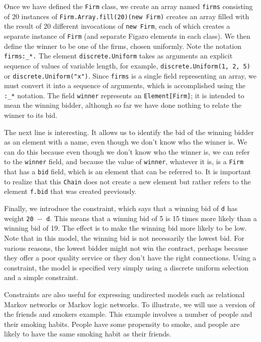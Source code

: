 Once we have defined the \texttt{Firm} class, we create an array named \texttt{firms} consisting of 20 instances of \texttt{Firm.Array.fill(20)(new Firm)} creates an array filled with the result of 20 different invocations of \texttt{new Firm}, each of which creates a separate instance of  \texttt{Firm} (and separate Figaro elements in each class). We then define the winner to be one of the firms, chosen uniformly. Note the notation \texttt{firms:\_*.} The element \texttt{discrete.Uniform} takes as arguments an explicit sequence of values of variable length, for example, \texttt{discrete.Uniform(1, 2, 5)} or \texttt{discrete.Uniform("x")}. Since \texttt{firms} is a single field representing an array, we must convert it into a sequence of arguments, which is accomplished using the \texttt{:\_*} notation. The field \texttt{winner} represents an \texttt{Element[Firm]}; it is intended to mean the winning bidder, although so far we have done nothing to relate the winner to its bid.
 
The next line is interesting. It allows us to identify the bid of the winning bidder as an element with a name, even though we don't know who the winner is. We can do this because even though we don't know who the winner is, we can refer to the \texttt{winner} field, and because the value of \texttt{winner}, whatever it is, is a \texttt{Firm} that has a \texttt{bid} field, which is an element that can be referred to. It is important to realize that this \texttt{Chain} does not create a new element but rather refers to the element \texttt{f.bid} that was created previously.

Finally, we introduce the constraint, which says that a winning bid of \texttt{d} has weight \texttt{20 $-$ d}. This means that a winning bid of 5 is 15 times more likely than a winning bid of 19. The effect is to make the winning bid more likely to be low. Note that in this model, the winning bid is not necessarily the lowest bid. For various reasons, the lowest bidder might not win the contract, perhaps because they offer a poor quality service or they don't have the right connections. Using a constraint, the model is specified very simply using a discrete uniform selection and a simple constraint.

Constraints are also useful for expressing undirected models such as relational Markov networks or Markov logic networks. To illustrate, we will use a version of the friends and smokers example. This example involves a number of people and their smoking habits. People have some propensity to smoke, and people are likely to have the same smoking habit as their friends.


